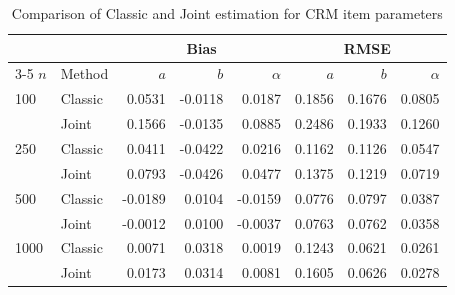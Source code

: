 \begin{table}[htbp]
\centering
\caption{Comparison of Classic and Joint estimation for CRM item parameters}
\label{tab:crm-item-parameters}
\begin{tabular}{llrrrrrr}
\hline
 &  & \multicolumn{3}{c}{Bias} & \multicolumn{3}{c}{RMSE} \\
\cline{3-5} \cline{6-8}
$n$ & Method & $a$ & $b$ & $\alpha$ & $a$ & $b$ & $\alpha$ \\
\hline
100  & Classic &  0.0531 & -0.0118 &  0.0187 & 0.1856 & 0.1676 & 0.0805 \\
     & Joint   &  0.1566 & -0.0135 &  0.0885 & 0.2486 & 0.1933 & 0.1260 \\
\hline
250  & Classic &  0.0411 & -0.0422 &  0.0216 & 0.1162 & 0.1126 & 0.0547 \\
     & Joint   &  0.0793 & -0.0426 &  0.0477 & 0.1375 & 0.1219 & 0.0719 \\
\hline
500  & Classic & -0.0189 &  0.0104 & -0.0159 & 0.0776 & 0.0797 & 0.0387 \\
     & Joint   & -0.0012 &  0.0100 & -0.0037 & 0.0763 & 0.0762 & 0.0358 \\
\hline
1000 & Classic &  0.0071 &  0.0318 &  0.0019 & 0.1243 & 0.0621 & 0.0261 \\
     & Joint   &  0.0173 &  0.0314 &  0.0081 & 0.1605 & 0.0626 & 0.0278 \\
\hline
\end{tabular}
\end{table}
